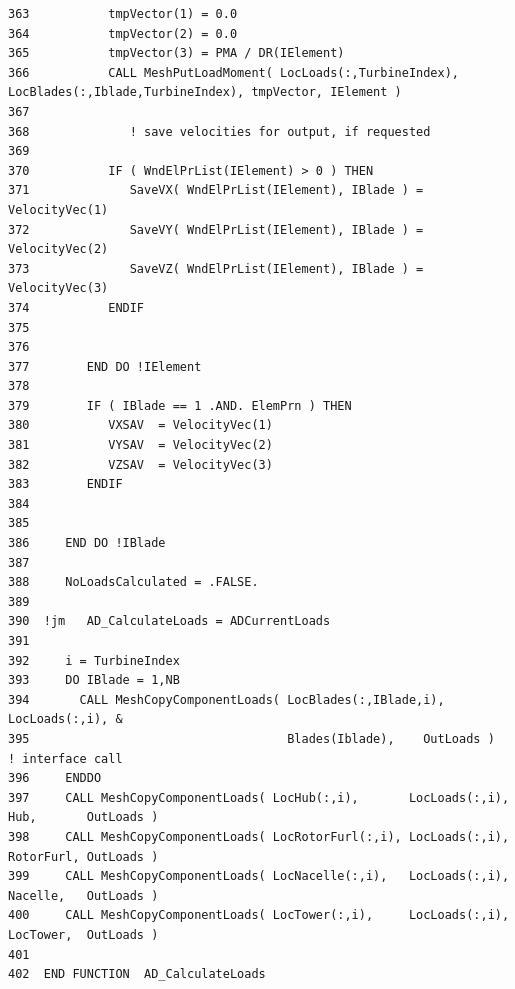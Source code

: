 \documentclass[11pt]{article}
\begin{document}
{\begin{verbatim}
363           tmpVector(1) = 0.0
364           tmpVector(2) = 0.0
365           tmpVector(3) = PMA / DR(IElement)
366           CALL MeshPutLoadMoment( LocLoads(:,TurbineIndex), LocBlades(:,Iblade,TurbineIndex), tmpVector, IElement )
367  
368              ! save velocities for output, if requested
369  
370           IF ( WndElPrList(IElement) > 0 ) THEN
371              SaveVX( WndElPrList(IElement), IBlade ) = VelocityVec(1)
372              SaveVY( WndElPrList(IElement), IBlade ) = VelocityVec(2)
373              SaveVZ( WndElPrList(IElement), IBlade ) = VelocityVec(3)
374           ENDIF
375           
376  
377        END DO !IElement
378  
379        IF ( IBlade == 1 .AND. ElemPrn ) THEN
380           VXSAV  = VelocityVec(1)
381           VYSAV  = VelocityVec(2)
382           VZSAV  = VelocityVec(3)
383        ENDIF
384  
385  
386     END DO !IBlade
387  
388     NoLoadsCalculated = .FALSE.
389     
390  !jm   AD_CalculateLoads = ADCurrentLoads
391  
392     i = TurbineIndex
393     DO IBlade = 1,NB
394       CALL MeshCopyComponentLoads( LocBlades(:,IBlade,i), LocLoads(:,i), &
395                                    Blades(Iblade),    OutLoads )  ! interface call
396     ENDDO
397     CALL MeshCopyComponentLoads( LocHub(:,i),       LocLoads(:,i), Hub,       OutLoads )
398     CALL MeshCopyComponentLoads( LocRotorFurl(:,i), LocLoads(:,i), RotorFurl, OutLoads )
399     CALL MeshCopyComponentLoads( LocNacelle(:,i),   LocLoads(:,i), Nacelle,   OutLoads )
400     CALL MeshCopyComponentLoads( LocTower(:,i),     LocLoads(:,i), LocTower,  OutLoads )
401  
402  END FUNCTION  AD_CalculateLoads
\end{verbatim}
}


%
%
%
%
\end{document}
